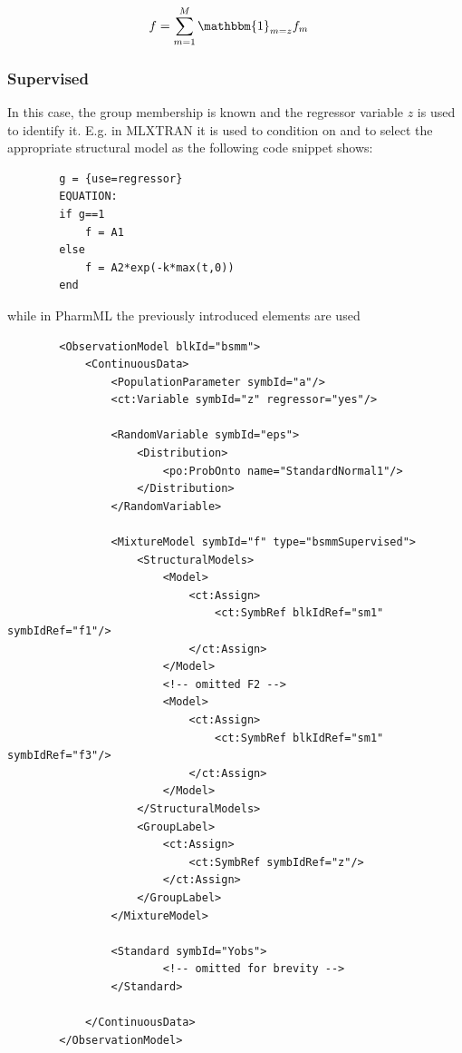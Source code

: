 \begin{align}
f &= \sum^M_{m=1} \mathbbm{1}_{m=z} f_m	\nonumber
\end{align}


\subsubsection*{Supervised}
In this case, the group membership is known and the regressor
variable $z$ is used to identify it. E.g. in MLXTRAN it is used to condition 
on and to select the appropriate structural model as the following 
code snippet shows:
\lstset{language=MLX}
\begin{lstlisting}
		g = {use=regressor}
		EQUATION:
		if g==1
   			f = A1
		else
   			f = A2*exp(-k*max(t,0))
		end
\end{lstlisting}
while in PharmML the previously introduced elements are used

\lstset{language=XML}
\begin{lstlisting}
        <ObservationModel blkId="bsmm">
            <ContinuousData>
                <PopulationParameter symbId="a"/>
                <ct:Variable symbId="z" regressor="yes"/>
                
                <RandomVariable symbId="eps">
                    <Distribution>
                        <po:ProbOnto name="StandardNormal1"/>
                    </Distribution>
                </RandomVariable>
                
                <MixtureModel symbId="f" type="bsmmSupervised">
                    <StructuralModels>
                        <Model>
                            <ct:Assign>
                                <ct:SymbRef blkIdRef="sm1" symbIdRef="f1"/>
                            </ct:Assign>
                        </Model>
                        <!-- omitted F2 -->
                        <Model>
                            <ct:Assign>
                                <ct:SymbRef blkIdRef="sm1" symbIdRef="f3"/>
                            </ct:Assign>
                        </Model>
                    </StructuralModels>
                    <GroupLabel>
                        <ct:Assign>
                            <ct:SymbRef symbIdRef="z"/>
                        </ct:Assign>
                    </GroupLabel>
                </MixtureModel>
                
                <Standard symbId="Yobs">
                        <!-- omitted for brevity -->
                </Standard>
                
            </ContinuousData>
        </ObservationModel>

\end{lstlisting}


